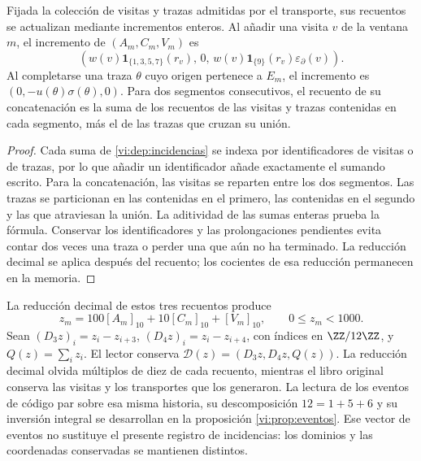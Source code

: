 \begin{proposition}
\label{vi:dep:libro-actualizacion}
Fijada la colección de visitas y trazas admitidas por el transporte, sus
recuentos se actualizan mediante incrementos enteros. Al añadir una
visita \(v\) de la ventana \(m\), el incremento de \((A_m,C_m,V_m)\) es
\[
 \left(w(v)\mathbf1_{\{1,3,5,7\}}(r_v),\,0,\,
 w(v)\mathbf1_{\{9\}}(r_v)\varepsilon_\partial(v)\right).
\]
Al completarse una traza \(\theta\) cuyo origen pertenece a \(E_m\),
el incremento es \((0,-u(\theta)\sigma(\theta),0)\).
Para dos segmentos consecutivos, el recuento de su concatenación es
la suma de los recuentos de las visitas y trazas contenidas en cada
segmento, más el de las trazas que cruzan su unión.
\end{proposition}
\begin{proof}
Cada suma de \eqref{vi:dep:incidencias} se indexa por identificadores
de visitas o de trazas, por lo que añadir un identificador añade
exactamente el sumando escrito. Para la concatenación, las visitas
se reparten entre los dos segmentos. Las trazas se particionan en
las contenidas en el primero, las contenidas en el segundo y las
que atraviesan la unión. La aditividad de las sumas enteras prueba
la fórmula. Conservar los identificadores y las prolongaciones
pendientes evita contar dos veces una traza o perder una que aún
no ha terminado. La reducción decimal se aplica después del
recuento; los cocientes de esa reducción permanecen en la memoria.
\end{proof}

La reducción decimal de estos tres recuentos produce
\begin{equation}
 z_m=100[A_m]_{10}+10[C_m]_{10}+[V_m]_{10},
 \qquad 0\le z_m<1000.
 \label{vi:dep:bloque-incidencial}
\end{equation}
Sean \((D_3z)_i=z_i-z_{i+3}\),
\((D_4z)_i=z_i-z_{i+4}\), con índices en \(\ZZ/12\ZZ\), y
\(Q(z)=\sum_i z_i\). El lector conserva
\(\mathcal D(z)=(D_3z,D_4z,Q(z))\). La reducción decimal olvida
múltiplos de diez de cada recuento, mientras el libro original conserva
las visitas y los transportes que los generaron.
La lectura de los eventos de código par sobre esa misma historia,
su descomposición \(12=1+5+6\) y su inversión integral se
desarrollan en la proposición \ref{vi:prop:eventos}. Ese vector
de eventos no sustituye el presente registro de incidencias:
los dominios y las coordenadas conservadas se mantienen distintos.

